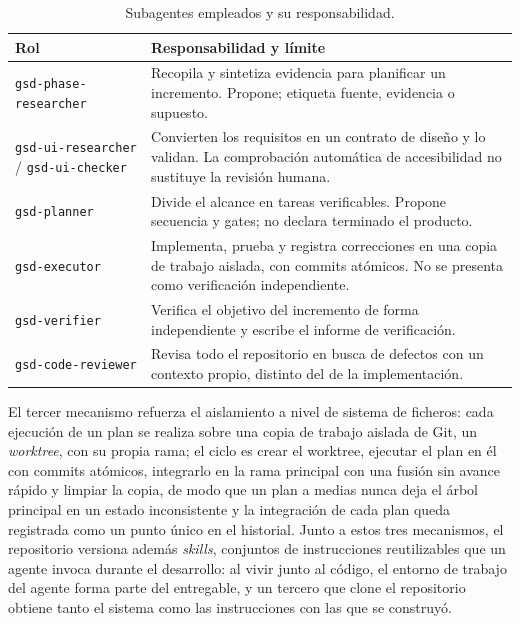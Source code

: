\begin{table}[H]
\centering
\begin{tabularx}{\textwidth}{ | Y | Y | }
    \hline
    \textbf{Rol} & \textbf{Responsabilidad y límite} \\
    \hline
    \texttt{gsd-phase-researcher} & Recopila y sintetiza evidencia para planificar un incremento. Propone; etiqueta fuente, evidencia o supuesto. \\
    \hline
    \texttt{gsd-ui-researcher} / \texttt{gsd-ui-checker} & Convierten los requisitos en un contrato de diseño y lo validan. La comprobación automática de accesibilidad no sustituye la revisión humana. \\
    \hline
    \texttt{gsd-planner} & Divide el alcance en tareas verificables. Propone secuencia y gates; no declara terminado el producto. \\
    \hline
    \texttt{gsd-executor} & Implementa, prueba y registra correcciones en una copia de trabajo aislada, con commits atómicos. No se presenta como verificación independiente. \\
    \hline
    \texttt{gsd-verifier} & Verifica el objetivo del incremento de forma independiente y escribe el informe de verificación. \\
    \hline
    \texttt{gsd-code-reviewer} & Revisa todo el repositorio en busca de defectos con un contexto propio, distinto del de la implementación. \\
    \hline
\end{tabularx}
\caption{Subagentes empleados y su responsabilidad.}
\label{tab:subagentes}
\end{table}

El tercer mecanismo refuerza el aislamiento a nivel de sistema de ficheros: cada ejecución de
un plan se realiza sobre una copia de trabajo aislada de Git, un \textit{worktree}, con su
propia rama; el ciclo es crear el worktree, ejecutar el plan en él con commits atómicos,
integrarlo en la rama principal con una fusión sin avance rápido y limpiar la copia, de modo que
un plan a medias nunca deja el árbol principal en un estado inconsistente y la integración de
cada plan queda registrada como un punto único en el historial. Junto a estos tres mecanismos,
el repositorio versiona además \textit{skills}, conjuntos de instrucciones reutilizables que un
agente invoca durante el desarrollo: al vivir junto al código, el entorno de trabajo del agente
forma parte del entregable, y un tercero que clone el repositorio obtiene tanto el sistema como
las instrucciones con las que se construyó.

